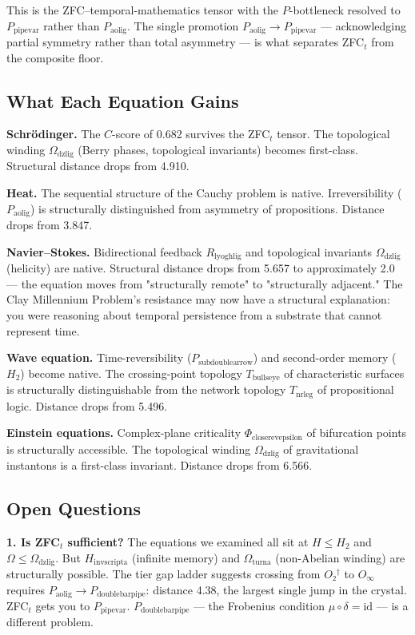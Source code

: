 \documentclass[12pt,a4paper]{article}
\begin{document}
This is the ZFC--temporal-mathematics tensor with the $P$-bottleneck resolved to $P_{\text{pipevar}}$ rather than $P_{\text{aolig}}$. The single promotion $P_{\text{aolig}} \to P_{\text{pipevar}}$ --- acknowledging partial symmetry rather than total asymmetry --- is what separates ZFC$_t$ from the composite floor.

\subsection{What Each Equation Gains}

\textbf{Schrödinger.} The $C$-score of 0.682 survives the ZFC$_t$ tensor. The topological winding $\Omega_{\text{dzlig}}$ (Berry phases, topological invariants) becomes first-class. Structural distance drops from 4.910.

\textbf{Heat.} The sequential structure of the Cauchy problem is native. Irreversibility ($P_{\text{aolig}}$) is structurally distinguished from asymmetry of propositions. Distance drops from 3.847.

\textbf{Navier--Stokes.} Bidirectional feedback $R_{\text{lyoghlig}}$ and topological invariants $\Omega_{\text{dzlig}}$ (helicity) are native. Structural distance drops from 5.657 to approximately 2.0 --- the equation moves from "structurally remote" to "structurally adjacent." The Clay Millennium Problem's resistance may now have a structural explanation: you were reasoning about temporal persistence from a substrate that cannot represent time.

\textbf{Wave equation.} Time-reversibility ($P_{\text{subdoublearrow}}$) and second-order memory ($H_2$) become native. The crossing-point topology $T_{\text{bullseye}}$ of characteristic surfaces is structurally distinguishable from the network topology $T_{\text{nrleg}}$ of propositional logic. Distance drops from 5.496.

\textbf{Einstein equations.} Complex-plane criticality $\Phi_{\text{closerevepsilon}}$ of bifurcation points is structurally accessible. The topological winding $\Omega_{\text{dzlig}}$ of gravitational instantons is a first-class invariant. Distance drops from 6.566.

\subsection{Open Questions}

\textbf{1. Is ZFC$_t$ sufficient?} The equations we examined all sit at $H \leq H_2$ and $\Omega \leq \Omega_{\text{dzlig}}$. But $H_{\text{invscripta}}$ (infinite memory) and $\Omega_{\text{turna}}$ (non-Abelian winding) are structurally possible. The tier gap ladder suggests crossing from $O₂^\dagger$ to $O_{\infty}$ requires $P_{\text{aolig}} \to P_{\text{doublebarpipe}}$: distance 4.38, the largest single jump in the crystal. ZFC$_t$ gets you to $P_{\text{pipevar}}$. $P_{\text{doublebarpipe}}$ --- the Frobenius condition $\mu \circ \delta = \text{id}$ --- is a different problem.
\end{document}
